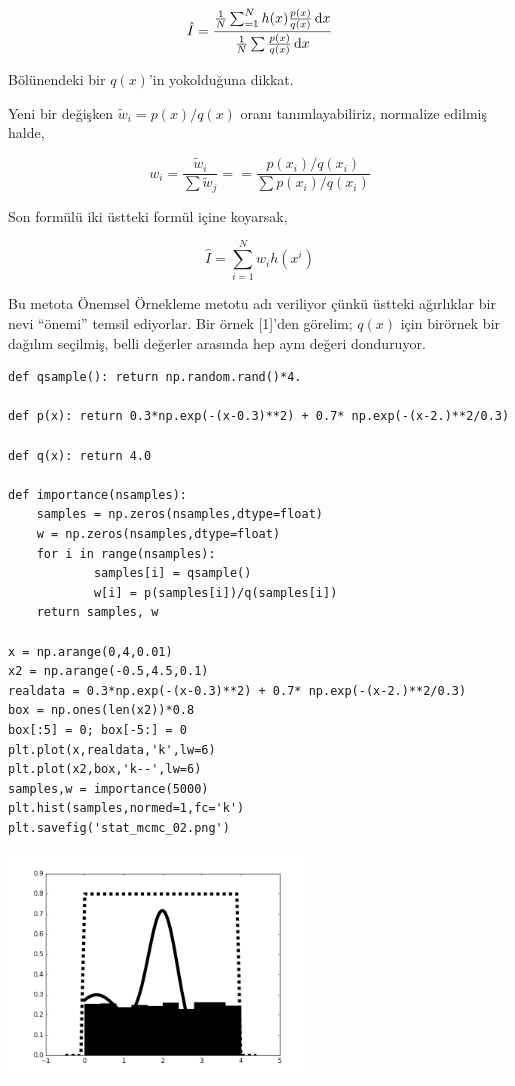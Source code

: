 \documentclass[12pt,fleqn]{article}\usepackage{../../common}
\begin{document}
$$ \hat{I} = \frac
{\frac{1}{N}\sum _{=1}^{N} h(x) \frac{p(x)}{q(x)} \,\mathrm{d} x}
{\frac{1}{N}\sum \frac{p(x)}{q(x)} \,\mathrm{d} x}
$$

Bölünendeki bir $q(x)$'in yokolduğuna dikkat.

Yeni bir değişken $\tilde{w}_i = p(x)/q(x)$ oranı tanımlayabiliriz, normalize
edilmiş halde,

$$ w_i = \frac{\tilde{w}_i}{\sum \tilde{w}_j} =
= \frac{p(x_i)/q(x_i)}{\sum p(x_i)/q(x_i)}
$$

Son formülü iki üstteki formül içine koyarsak,

$$ \hat{I} = \sum _{i=1}^{N} w_i h(x^i)$$

Bu metota Önemsel Örnekleme metotu adı veriliyor çünkü üstteki ağırlıklar bir
nevi ``önemi'' temsil ediyorlar.  Bir örnek [1]'den görelim; $q(x)$ için
birörnek bir dağılım seçilmiş, belli değerler arasında hep aynı değeri
donduruyor.

\begin{verbatim}
def qsample(): return np.random.rand()*4.

def p(x): return 0.3*np.exp(-(x-0.3)**2) + 0.7* np.exp(-(x-2.)**2/0.3) 

def q(x): return 4.0

def importance(nsamples):    
    samples = np.zeros(nsamples,dtype=float)
    w = np.zeros(nsamples,dtype=float)    
    for i in range(nsamples):
            samples[i] = qsample()
            w[i] = p(samples[i])/q(samples[i])                
    return samples, w

x = np.arange(0,4,0.01)
x2 = np.arange(-0.5,4.5,0.1)
realdata = 0.3*np.exp(-(x-0.3)**2) + 0.7* np.exp(-(x-2.)**2/0.3) 
box = np.ones(len(x2))*0.8
box[:5] = 0; box[-5:] = 0
plt.plot(x,realdata,'k',lw=6)
plt.plot(x2,box,'k--',lw=6)
samples,w = importance(5000)
plt.hist(samples,normed=1,fc='k')
plt.savefig('stat_mcmc_02.png')
\end{verbatim}

\includegraphics[height=6cm]{stat_mcmc_02.png}
\end{document}
